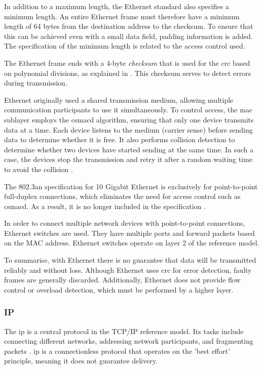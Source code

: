 In addition to a maximum length, the Ethernet standard also specifies a minimum length. An entire Ethernet frame must therefore have a minimum length of 64 bytes from the destination address to the checksum. To ensure that this can be achieved even with a small data field, padding information is added. The specification of the minimum length is related to the access control used.

The Ethernet frame ends with a 4-byte \textit{checksum} that is used for the \ac{crc} based on polynomial divisions, as explained in \cite{Tanenbaum2010}.  This checksum serves to detect errors during transmission.

Ethernet originally used a shared transmission medium, allowing multiple communication participants to use it simultaneously. To control access, the \ac{mac} sublayer employs the \ac{csmacd} algorithm, ensuring that only one device transmits data at a time. Each device listens to the medium (carrier sense) before sending data to determine whether it is free. It also performs collision detection to determine whether two devices have started sending at the same time. In such a case, the devices stop the transmission and retry it after a random waiting time to avoid the collision \cite{Tanenbaum2010}.

The 802.3an specification for 10 Gigabit Ethernet is exclusively for point-to-point full-duplex connections, which eliminates the need for access control such as \ac{csmacd}. As a result, it is no longer included in the specification \cite{10GbEDefinition}.

In order to connect multiple network devices with point-to-point connections, Ethernet switches are used. They have multiple ports and forward packets based on the MAC address. Ethernet switches operate on layer 2 of the reference model.

To summarise, with Ethernet there is no guarantee that data will be transmitted reliably and without loss. Although Ethernet uses \ac{crc} for error detection, faulty frames are generally discarded. Additionally, Ethernet does not provide flow control or overload detection, which must be performed by a higher layer.


\subsubsection{IP}

The \ac{ip} is a central protocol in the TCP/IP reference model. Its tasks include connecting different networks, addressing network participants, and fragmenting packets \cite{Weigel2021}. \ac{ip} is a connectionless protocol that operates on the 'best effort' principle, meaning it does not guarantee delivery.

